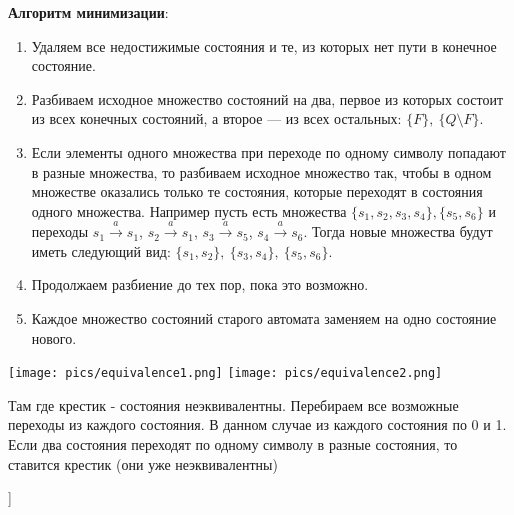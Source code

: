 \textbf{Алгоритм минимизации}:
\begin{enumerate}
    \item Удаляем все недостижимые состояния и те, из которых нет пути в конечное состояние.
    \item Разбиваем исходное множество состояний на два, первое из которых состоит из всех конечных состояний, а второе --- из всех остальных: $\{F\},~\{Q \setminus F\}$.
    \item Если элементы одного множества при переходе по одному символу попадают в разные множества, то разбиваем исходное множество так, чтобы в одном множестве оказались только те состояния, которые переходят в состояния одного множества.
    Например пусть есть множества $\{s_1,s_2,s_3,s_4\},\{s_5,s_6\}$ и переходы $s_1 \xrightarrow{a} s_1$, $s_2 \xrightarrow{a} s_1$, $s_3 \xrightarrow{a} s_5$, $s_4 \xrightarrow{a} s_6$.
    Тогда новые множества будут иметь следующий вид: $\{s_1,s_2\},~\{s_3,s_4\},~\{s_5,s_6\}$.
    \item Продолжаем разбиение до тех пор, пока это возможно.
    \item Каждое множество состояний старого автомата заменяем на одно состояние нового.
\end{enumerate}

\texttt{[image: pics/equivalence1.png]}
\texttt{[image: pics/equivalence2.png]}

Там где крестик - состояния неэквивалентны. Перебираем все возможные переходы из каждого состояния. В данном случае из каждого состояния по 0 и 1. Если два состояния переходят по одному символу в разные состояния, то ставится крестик (они уже неэквивалентны)




\bigbreak
[\cite[page 25-37]{ignatiev4}]
